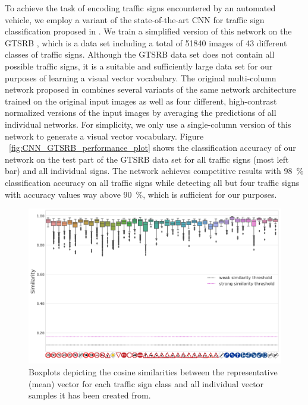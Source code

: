 To achieve the task of encoding traffic signs encountered by an automated vehicle, we employ a variant of the state-of-the-art \ac{CNN} for traffic sign classification proposed in \cite{Ciresan2012}.
We train a simplified version of this network on the \acf{GTSRB} \cite{Stallkamp2012}, which is a data set including a total of \num{51840} images of \num{43} different classes of traffic signs.
Although the \ac{GTSRB} data set does not contain all possible traffic signs, it is a suitable and sufficiently large data set for our purposes of learning a visual vector vocabulary.
The original multi-column network proposed in \cite{Ciresan2012} combines several variants of the same network architecture trained on the original input images as well as four different, high-contrast normalized versions of the input images by averaging the predictions of all individual networks.
For simplicity, we only use a single-column version of this network to generate a visual vector vocabulary. 
Figure ~\ref{fig:CNN_GTSRB_performance_plot} shows the classification accuracy of our network on the test part of the \ac{GTSRB} data set for all traffic signs (most left bar) and all individual signs.
The network achieves competitive results with \SI{98}{\percent} classification accuracy on all traffic signs while detecting all but four traffic signs with accuracy values way above \SI{90}{\percent}, which is sufficient for our purposes.

\begin{figure}[t]
    \centering
    \includegraphics[width=0.9\linewidth]{imgs/Visual_vocab_traffic_signs_similarity_with_representative_vecs.png}
    \caption{Boxplots depicting the cosine similarities between the representative (mean) vector for each traffic sign class and all individual vector samples it has been created from.}
    \label{fig:visual_vocab_traffic_signs_similarity_with_representative_vecs}
\end{figure}

